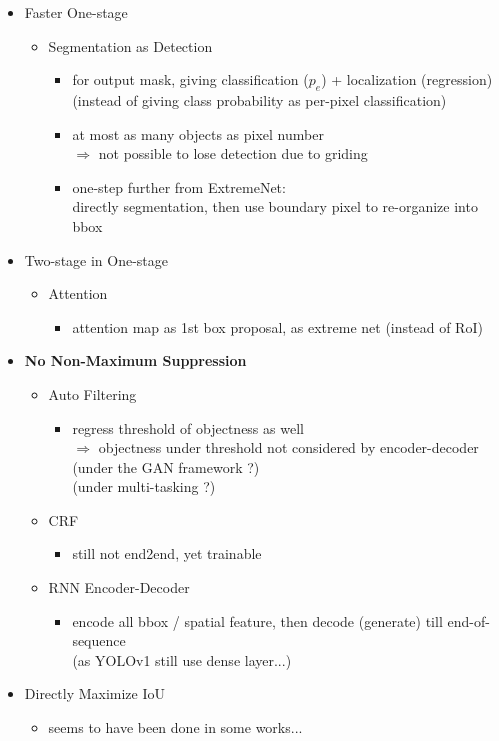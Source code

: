 \begin{itemize}
\item Faster One-stage
	\begin{itemize}
	\item Segmentation as Detection
		\begin{itemize}
		\item for output mask, giving classification ($p_e$) + localization (regression) \\
		(instead of giving class probability as per-pixel classification)
		\item at most as many objects as pixel number \\ 
		$\Rightarrow$ not possible to lose detection due to griding
		\item one-step further from ExtremeNet: \\
		directly segmentation, then use boundary pixel to re-organize into bbox
		\end{itemize}
	\end{itemize}
\item Two-stage in One-stage
	\begin{itemize}
	\item Attention
		\begin{itemize}
		\item attention map as 1st box proposal, as extreme net (instead of RoI)
		\end{itemize}
	\end{itemize}
\item \textbf{No Non-Maximum Suppression}
	\begin{itemize}
	\item Auto Filtering
		\begin{itemize}
		\item regress threshold of objectness as well \\
		$\Rightarrow$ objectness under threshold not considered by encoder-decoder \\
		(under the GAN framework ?) \\
		(under multi-tasking ?)
		\end{itemize}
	\item CRF
		\begin{itemize}
		\item still not end2end, yet trainable
		\end{itemize}
	\item RNN Encoder-Decoder
		\begin{itemize}
		\item encode all bbox / spatial feature, then decode (generate) till end-of-sequence \\
		(as YOLOv1 still use dense layer...)
		\end{itemize}
	\end{itemize}
\item Directly Maximize IoU
	\begin{itemize}
	\item seems to have been done in some works...
	\end{itemize}
\end{itemize}

